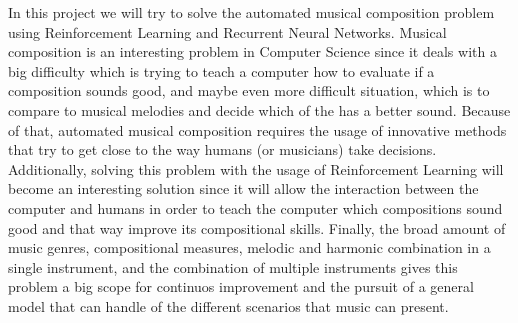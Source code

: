 In this project we will try to solve the automated musical composition problem using Reinforcement Learning and Recurrent Neural Networks. Musical composition is an interesting problem in Computer Science since it deals with a big difficulty which is trying to teach a computer how to evaluate if a composition sounds good, and maybe even more difficult situation, which is to compare to musical melodies and decide which of the has a better sound. Because of that, automated musical composition requires the usage of innovative methods that try to get close to the way humans (or musicians) take decisions. Additionally, solving this problem with the usage of Reinforcement Learning will become an interesting solution since it will allow the interaction between the computer and humans in order to teach the computer which compositions sound good and that way improve its compositional skills. Finally, the broad amount of music genres, compositional measures, melodic and harmonic combination in a single instrument, and the combination of multiple instruments gives this problem a big scope for continuos improvement and the pursuit of a general model that can handle of the different scenarios that music can present.